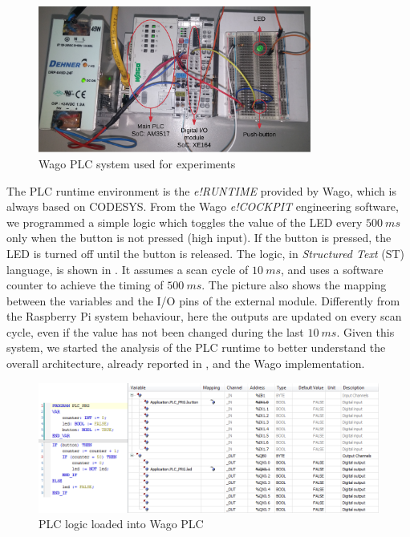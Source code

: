 \begin{figure}[h]
\centerline{\includegraphics[width=0.8\textwidth]{res/plc_system}}
\caption{Wago PLC system used for experiments \label{fig:plc_system}}
\end{figure}

The PLC runtime environment is the \emph{e!RUNTIME} provided by Wago, which is always based on CODESYS. From the Wago \emph{e!COCKPIT} engineering software,
we programmed a simple logic which toggles the value of the LED every $\SI{500}{ms}$ only when the button is not pressed (high input). If the button is pressed,
the LED is turned off until the button is released. The logic, in \emph{Structured Text} (ST) language, is shown in .
It assumes a scan cycle of $\SI{10}{ms}$, and uses a software counter to achieve the timing of $\SI{500}{ms}$. The picture also shows the mapping between the variables
and the I/O pins of the external module. Differently from the Raspberry Pi system behaviour, here the outputs are updated on every scan cycle, even if the value has not been changed
during the last $\SI{10}{ms}$.
Given this system, we started the analysis of the PLC runtime to better understand the overall architecture, already reported in , and the Wago implementation.

\begin{figure}[h]
\centerline{\includegraphics[width=\textwidth]{res/plc_logic}}
\caption{PLC logic loaded into Wago PLC \label{fig:plc_logic}}
\end{figure}


